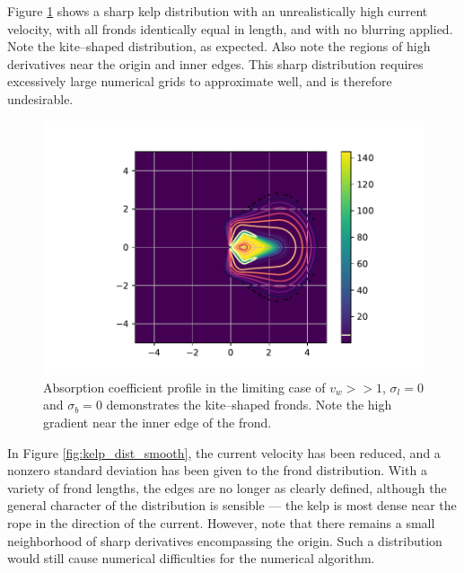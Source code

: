 \documentclass[ms,cpyr,lof,lot]{uathesis}
\begin{document}
Figure \ref{fig:kelp_dist_sharp} shows a sharp kelp distribution with an unrealistically high current velocity, with all fronds identically equal in length, and with no blurring applied.
Note the kite--shaped distribution, as expected.
Also note the regions of high derivatives near the origin and inner edges.
This sharp distribution requires excessively large numerical grids to approximate well, and is therefore undesirable.
\begin{figure}[H]
  \centering
  \includegraphics[width=5in]{kelp_dist_sharp}
  \caption{Absorption coefficient profile in the limiting case of $v_w>>1$, $\sigma_l=0$ and $\sigma_b=0$ demonstrates the kite--shaped fronds. Note the high gradient near the inner edge of the frond.}
  \label{fig:kelp_dist_sharp}
\end{figure}

In Figure \ref{fig:kelp_dist_smooth}, the current velocity has been reduced, and a nonzero standard deviation has been given to the frond distribution.
With a variety of frond lengths, the edges are no longer as clearly defined, although the general character of the distribution is sensible --- the kelp is most dense near the rope in the direction of the current.
However, note that there remains a small neighborhood of sharp derivatives encompassing the origin.
Such a distribution would still cause numerical difficulties for the numerical algorithm.
\end{document}

